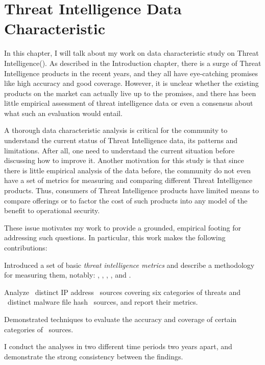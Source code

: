 \chapter{Threat Intelligence Data Characteristic}
\label{chapter:data_character}

In this chapter, I will talk about my work on data characteristic
study on Threat Intelligence(\ti). As described in the Introduction 
chapter, there is a surge of Threat Intelligence products in the 
recent years, and they all have eye-catching promises like high 
accuracy and good coverage. However, it is unclear whether the
existing products on the market can actually live up to the 
promises, and there has been little empirical assessment of threat
intelligence data or even a consensus about what such an
evaluation would entail. 

A thorough data characteristic analysis is critical for the 
community to understand the current status of Threat Intelligence 
data, its patterns and limitations. After all, one need to understand
the current situation before discussing how to improve it. 
Another motivation for this 
study is that since there is little empirical analysis of the 
data before, the community do not even have a set of metrics for
measuring and comparing different Threat Intelligence products. 
Thus, consumers of Threat Intelligence products have limited means 
to compare offerings or to factor the cost of such products into 
any model of the benefit to operational security.

These issue motivates my work to provide a grounded,
empirical footing for addressing such questions. In particular,
this work makes the following contributions:
\begin{prettylist}
\item Introduced a set of basic \emph{threat intelligence metrics}
and describe a methodology for measuring them, notably: 
,
, ,
,  and .
\item Analyze \numipfeeds\ distinct IP address \ti\ sources covering
six categories of threats and \numhashfeeds\ distinct malware file hash
\ti\ sources, and report their metrics.
\item Demonstrated techniques to evaluate the accuracy and coverage of
certain categories of \ti\ sources.
\item I conduct the analyses in two different time periods two 
years apart, and demonstrate the strong consistency between the 
findings.
\end{prettylist}

